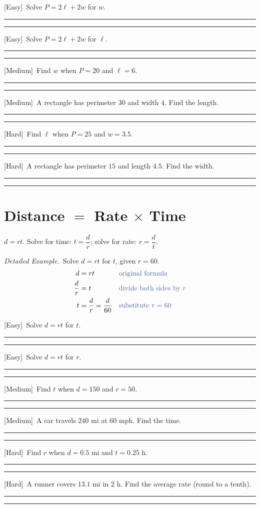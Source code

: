 \documentclass[11pt]{article}
\newcommand{\E}{\textcolor{levE}{\small[Easy]}\ }
\newcommand{\M}{\textcolor{levM}{\small[Medium]}\ }
\newcommand{\Hd}{\textcolor{levH}{\small[Hard]}\ }
\newcommand{\example}{\textit{\textcolor{fangblue}{Detailed Example.}}\ }
\newcommand{\twolines}{\par\vspace{0.7cm}%
  \textcolor{gray!55}{\rule{\linewidth}{0.3pt}}\par\vspace{0.7cm}%
  \textcolor{gray!55}{\rule{\linewidth}{0.3pt}}\par\vspace{2mm}}
\begin{document}
\begin{prob}
\item \E Solve $P = 2\ell + 2w$ for $w$. \twolines
\item \E Solve $P = 2\ell + 2w$ for $\ell$. \twolines
\item \M Find $w$ when $P = 20$ and $\ell = 6$. \twolines
\item \M A rectangle has perimeter $30$ and width $4$. Find the length. \twolines
\item \Hd Find $\ell$ when $P = 25$ and $w = 3.5$. \twolines
\item \Hd A rectangle has perimeter $15$ and length $4.5$. Find the width. \twolines
\end{prob}

\section{Distance $=$ Rate $\times$ Time}
\begin{keybox}
$d = rt$. \quad Solve for time: $t = \dfrac{d}{r}$; \quad solve for rate: $r = \dfrac{d}{t}$.
\end{keybox}

\example Solve $d = rt$ for $t$, given $r = 60$.
\begin{align*}
d &= rt &&\color{reasonclr}\text{original formula}\\
\frac{d}{r} &= t &&\color{reasonclr}\text{divide both sides by } r\\
t &= \frac{d}{r} = \frac{d}{60} &&\color{reasonclr}\text{substitute } r = 60
\end{align*}

\begin{prob}
\item \E Solve $d = rt$ for $t$. \twolines
\item \E Solve $d = rt$ for $r$. \twolines
\item \M Find $t$ when $d = 150$ and $r = 50$. \twolines
\item \M A car travels $240$ mi at $60$ mph. Find the time. \twolines
\item \Hd Find $r$ when $d = 0.5$ mi and $t = 0.25$ h. \twolines
\item \Hd A runner covers $13.1$ mi in $2$ h. Find the average rate (round to a tenth). \twolines
\end{prob}

\end{document}
